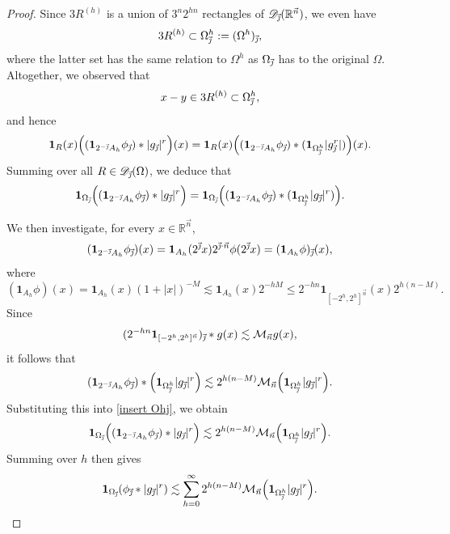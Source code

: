 \documentclass[11pt, reqno]{amsart}
\theoremstyle{definition}
\theoremstyle{remark}
\numberwithin{equation}{section}
\newcommand{\D}{\mathscr D}
\newcommand{\R}{\mathbb R}
\newcommand{\vj}{\vec{\textit{\j}}}
\newcommand{\vn}{\vec n}
\newcommand{\one}{\mathbf{1}}
\newcommand{\abs}[1]{|#1|}
\begin{document}
\begin{proof}
Since $3 R^{(h)}$ is a union of $3^n 2^{hn}$ rectangles of $\D_{\vj}(\R^{\vn})$, we even have
\begin{equation*}
3 R^{(h)}\subset\Omega^h_{\vj}:=(\Omega^h)_{\vj},
\end{equation*}
where the latter set has the same relation to $\Omega^h$ as $\Omega_{\vj}$ has to the original $\Omega$. Altogether, we observed that
\begin{equation*}
x-y\in 3 R^{(h)}\subset\Omega^h_{\vj},
\end{equation*}
and hence
\begin{equation*}
\one_R(x)\Big( (\one_{2^{-\vj}A_h}\phi_{\vj})*\abs{g_{\vj}}^r\Big) (x)
=\one_R(x) \Big( (\one_{2^{-\vj}A_h}\phi_{\vj})*(\one_{\Omega^h_{\vj}} \abs{g_{\vj}^r}) \Big) (x).
\end{equation*}
Summing over all $R\in\D_{\vj}(\Omega)$, we deduce that
\begin{equation}\label{insert Ohj}
\one_{\Omega_{\vj}} \Big((\one_{2^{-\vj}A_h}\phi_{\vj})*\abs{g_{\vj}}^r\Big)
=\one_{\Omega_{\vj}} \Big((\one_{2^{-\vj}A_h}\phi_{\vj})*(\one_{\Omega^h_{\vj}}\abs{g_{\vj}}^r)\Big).
\end{equation}

We then investigate, for every $x\in\mathbb R^{\vn}$,
\begin{equation*}
(\one_{2^{-\vj}A_h}\phi_{\vj})(x)
=\one_{A_h}(2^{\vj}x)2^{\vj\cdot\vn}\phi(2^{\vj}x)
=(\one_{A_h}\phi)_{\vj}(x),
\end{equation*}
where
\begin{equation*}
(\one_{A_h}\phi)(x)
=\one_{A_h}(x)(1+\abs{x})^{-M}
\lesssim\one_{A_h}(x)2^{-hM}\leq 2^{-hn}\one_{[-2^h,2^h]^{\vn}}(x)2^{h(n-M)}.
\end{equation*}
Since
\begin{equation*}
( 2^{-hn}\one_{[-2^h,2^h]^{\vn}})_{\vj}*g(x)\lesssim \mathcal M_{\vn}g(x),
\end{equation*}
it follows that
\begin{equation*}
(\one_{2^{-\vj}A_h}\phi_{\vj})*\Big(\one_{\Omega^h_{\vj}}\abs{g_{\vj}}^r\Big)
\lesssim 2^{h(n-M)} \mathcal M_{\vn}\Big(\one_{\Omega^h_{\vj}}\abs{g_{\vj}}^r\Big).
\end{equation*}
Substituting this into \eqref{insert Ohj}, we obtain
\begin{equation*}
\one_{\Omega_{\vj}} \Big((\one_{2^{-\vj}A_h}\phi_{\vj})*\abs{g_{\vj}}^r\Big)
\lesssim 2^{h(n-M)} \mathcal M_{\vn}\Big(\one_{\Omega^h_{\vj}}\abs{g_{\vj}}^r\Big).
\end{equation*}
Summing over $h$ then gives
\begin{equation}\label{insert Ohj 2}
\one_{\Omega_{\vj}}(\phi_{\vj}*\abs{g_{\vj}}^r)
\lesssim\sum_{h=0}^\infty 2^{h(n-M)} \mathcal M_{\vn}\Big(\one_{\Omega^h_{\vj}}\abs{g_{\vj}}^r\Big).
\end{equation}


\end{proof}
\end{document}
